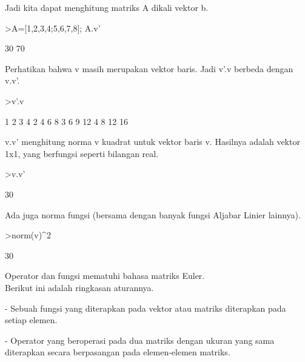 \documentclass[a4paper,10pt]{article}
\begin{document}
\begin{eulernotebook}
\begin{eulercomment}
\begin{eulercomment}
\begin{eulercomment}
\begin{eulercomment}
\begin{euleroutput}
\end{euleroutput}
\begin{eulercomment}
Jadi kita dapat menghitung matriks A dikali vektor b.
\end{eulercomment}
\begin{eulerprompt}
>A=[1,2,3,4;5,6,7,8]; A.v'
\end{eulerprompt}
\begin{euleroutput}
             30 
             70 
\end{euleroutput}
\begin{eulercomment}
Perhatikan bahwa v masih merupakan vektor baris. Jadi v'.v berbeda
dengan v.v'.
\end{eulercomment}
\begin{eulerprompt}
>v'.v
\end{eulerprompt}
\begin{euleroutput}
              1             2             3             4 
              2             4             6             8 
              3             6             9            12 
              4             8            12            16 
\end{euleroutput}
\begin{eulercomment}
v.v' menghitung norma v kuadrat untuk vektor baris v. Hasilnya adalah
vektor 1x1, yang berfungsi seperti bilangan real.
\end{eulercomment}
\begin{eulerprompt}
>v.v'
\end{eulerprompt}
\begin{euleroutput}
  30
\end{euleroutput}
\begin{eulercomment}
Ada juga norma fungsi (bersama dengan banyak fungsi Aljabar Linier
lainnya).
\end{eulercomment}
\begin{eulerprompt}
>norm(v)^2
\end{eulerprompt}
\begin{euleroutput}
  30
\end{euleroutput}
\begin{eulercomment}
Operator dan fungsi mematuhi bahasa matriks Euler.\\
Berikut ini adalah ringkasan aturannya.

- Sebuah fungsi yang diterapkan pada vektor atau matriks diterapkan
pada setiap elemen.

- Operator yang beroperasi pada dua matriks dengan ukuran yang sama
diterapkan secara berpasangan pada elemen-elemen matriks.


\end{eulercomment}
\end{eulercomment}
\end{eulercomment}
\end{eulercomment}
\end{eulercomment}
\end{eulernotebook}
\end{document}
